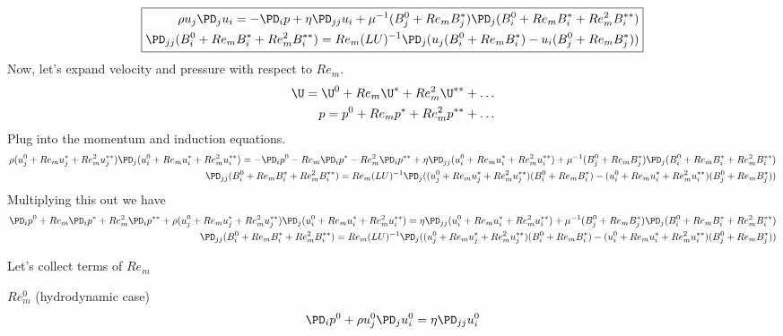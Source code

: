 \documentclass[11pt]{article}
\begin{document}
\begin{equation}\boxed{\begin{aligned}
\rho u_j \PD_j u_i = - \PD_i p + \eta \PD_{jj} u_i + \mu^{-1} (B_j^0 + Re_m B_j^*) \PD_j (B_i^0 + Re_m B_i^* + Re_m^2 B_i^{**}) \\
\PD_{jj} (B_i^0 + Re_m B_i^* + Re_m^2 B_i^{**}) = Re_m (LU)^{-1} \PD_j (u_j (B_i^0 + Re_m B_i^*) - u_i (B_j^0 + Re_m B_j^*))
\end{aligned}}\end{equation}
Now, let's expand velocity and pressure with respect to $Re_m$.
\begin{equation}\begin{aligned}
	\U = \U^0 + Re_m \U^* + Re_m^2 \U^{**} + \hdots \\
	p = p^0 + Re_m p^* + Re_m^2 p^{**} + \hdots
\end{aligned} \end{equation}
Plug into the momentum and induction equations.
\tiny\begin{equation}\begin{aligned}
\rho (u_j^0+Re_m u_j^*+Re_m^2 u_j^{**}) \PD_j (u_i^0+Re_m u_i^*+Re_m^2 u_i^{**}) = -\PD_i p^0 -Re_m\PD_i p^* -Re_m^2\PD_i p^{**} + \eta \PD_{jj} (u_i^0+Re_m u_i^*+Re_m^2 u_i^{**}) + \mu^{-1} (B_j^0 + Re_m B_j^*) \PD_j (B_i^0 + Re_m B_i^* + Re_m^2 B_i^{**}) \\
\PD_{jj} (B_i^0 + Re_m B_i^* + Re_m^2 B_i^{**}) = Re_m (LU)^{-1} \PD_j ((u_j^0+Re_m u_j^*+Re_m^2 u_j^{**}) (B_i^0 + Re_m B_i^*) - (u_i^0+Re_m u_i^*+Re_m^2 u_i^{**}) (B_j^0 + Re_m B_j^*))
\end{aligned}\end{equation}\normalsize
Multiplying this out we have
\tiny\begin{equation}\begin{aligned}
\PD_i p^0 + Re_m\PD_i p^* + Re_m^2\PD_i p^{**} + \rho (u_j^0+Re_m u_j^*+Re_m^2 u_j^{**}) \PD_j (u_i^0+Re_m u_i^*+Re_m^2 u_i^{**}) = \eta \PD_{jj} (u_i^0+Re_m u_i^*+Re_m^2 u_i^{**}) + \mu^{-1} (B_j^0 + Re_m B_j^*) \PD_j (B_i^0 + Re_m B_i^* + Re_m^2 B_i^{**}) \\
\PD_{jj} (B_i^0 + Re_m B_i^* + Re_m^2 B_i^{**}) = 
Re_m (LU)^{-1} \PD_j ((u_j^0+Re_m u_j^*+Re_m^2 u_j^{**}) (B_i^0 + Re_m B_i^*) - (u_i^0+Re_m u_i^*+Re_m^2 u_i^{**}) (B_j^0 + Re_m B_j^*))
\end{aligned}\end{equation}\normalsize

Let's collect terms of $Re_m$

$Re_m^0$ (hydrodynamic case)
\begin{equation}\begin{aligned}
\PD_i p^0 + \rho u_j^0 \PD_j u_i^0 = \eta \PD_{jj} u_i^0 \\
\end{aligned}\end{equation}
\end{document}
